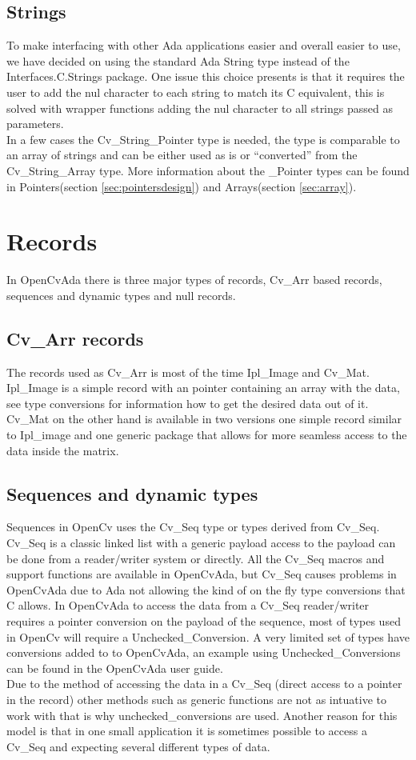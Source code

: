 \subsection{Strings}
To make interfacing with other Ada applications easier and overall easier to use, we have decided on using the standard Ada String type instead of the Interfaces.C.Strings package. One issue this choice presents is that it requires the user to add the nul character to each string to match its C equivalent, this is solved with wrapper functions adding the nul character to all strings passed as parameters. 
\\
In a few cases the Cv_String_Pointer type is needed, the type is comparable to an array of strings and can be either used as is or “converted” from the Cv_String_Array type. More information about the _Pointer types can be found in Pointers(section \ref{sec:pointersdesign}) and Arrays(section \ref{sec:array}).
\section{Records}
In OpenCvAda there is three major types of records, Cv_Arr based records, sequences and dynamic types and null records.
\subsection{Cv_Arr records}
The records used as Cv_Arr is most of the time Ipl_Image and Cv_Mat. Ipl_Image is a simple record with an pointer containing an array with the data, see type conversions for information how to get the desired data out of it. Cv_Mat on the other hand is available in two versions one simple record similar to Ipl_image and one generic package that allows for more seamless access to the data inside the matrix. 
\subsection{Sequences and dynamic types}
Sequences in OpenCv uses the Cv_Seq type or types derived from Cv_Seq. Cv_Seq is a classic linked list with a generic payload access to the payload can be done from a reader/writer system or directly. All the Cv_Seq macros and support functions are available in OpenCvAda, but Cv_Seq causes problems in OpenCvAda due to Ada not allowing the kind of on the fly type conversions that C allows. In OpenCvAda to access the data from a Cv_Seq reader/writer requires a pointer conversion on the payload of the sequence, most of types used in OpenCv will require a Unchecked_Conversion. A very limited set of types have conversions added to to OpenCvAda, an example using Unchecked_Conversions can be found in the OpenCvAda user guide.
\\
Due to the method of accessing the data in a Cv_Seq (direct access to a pointer in the record) other methods such as generic functions are not as intuative to work with that is why unchecked_conversions are used. Another reason for this model is that in one small application it is sometimes possible to access a Cv_Seq and expecting several different types of data.
